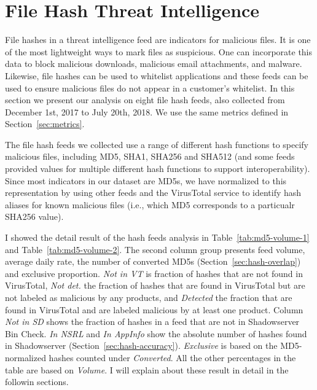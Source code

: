 \section{File Hash Threat Intelligence}
\label{sec:hash-analysis}

File hashes in a threat intelligence feed are indicators for malicious
files. It is one of the most lightweight ways to mark files as
suspicious. One can incorporate this data to block malicious
downloads, malicious email attachments, and malware. Likewise, file
hashes can be used to whitelist applications and these feeds can be
used to ensure malicious files do not appear in a customer's
whitelist. In this section we present our analysis on
eight file hash feeds, also collected from December 1st, 2017
to July 20th, 2018. We use the same metrics defined in
Section~\ref{sec:metrics}.

The file hash feeds we collected use a range of different hash
functions to specify malicious files, including MD5, SHA1, SHA256 and
SHA512 (and some feeds provided values for multiple different hash
functions to support interoperability).  Since most indicators in our
dataset are MD5s, we have normalized to this representation by using other
feeds and the VirusTotal service to identify hash aliases for known
malicious files (i.e., which MD5 corresponds to a particualr SHA256
value).  

I showed the detail result of the hash feeds analysis in 
Table~\ref{tab:md5-volume-1} and Table~\ref{tab:md5-volume-2}. The second column group presents feed 
volume, average daily rate, the number of converted MD5s 
(Section~\ref{sec:hash-overlap}) and exclusive proportion.
\textit{Not in VT} is fraction of hashes that are not found in 
VirusTotal, \textit{Not det.} the fraction of hashes that are found
in VirusTotal but are not labeled as malicious by any products, and
\textit{Detected} the fraction that are found in VirusTotal and are
labeled malicious by at least one product. Column \textit{Not in
SD} shows the fraction of hashes in a feed that are not in
Shadowserver Bin Check. \textit{In NSRL} and \textit{In AppInfo}
show the absolute number of hashes found in Shadowserver
(Section~\ref{sec:hash-accuracy}). \textit{Exclusive} is based on
the MD5-normalized hashes counted under \textit{Converted}. All the
other percentages in the table are based on \textit{Volume}. I
will explain about these result in detail in the followin sections.


